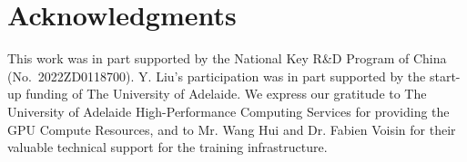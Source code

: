  

\section*{Acknowledgments}
 This work was in part supported by the National Key R\&D Program of China (No.\  2022ZD0118700).
  Y. Liu's participation was in part supported by the start-up funding of  The University of Adelaide.  
We express our gratitude to The University of Adelaide High-Performance Computing Services for providing the GPU Compute Resources, and to Mr. Wang Hui and Dr. Fabien Voisin for their valuable technical support for the training infrastructure.










